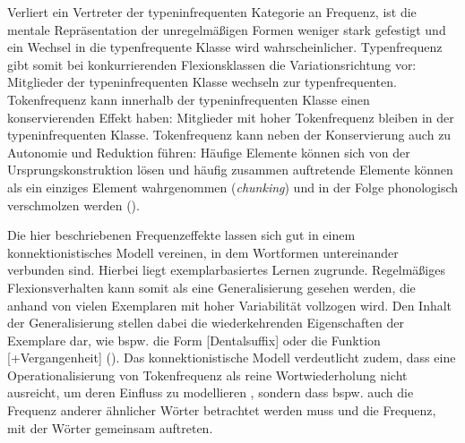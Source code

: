 Verliert ein Vertreter der typeninfrequenten Kategorie an Frequenz, ist die mentale Repräsentation der unregelmäßigen Formen weniger stark gefestigt und ein Wechsel in die typenfrequente Klasse wird wahrscheinlicher. Typenfrequenz gibt somit bei konkurrierenden Flexionsklassen die Variationsrichtung vor: Mitglieder der typeninfrequenten Klasse wechseln zur typenfrequenten. Tokenfrequenz kann innerhalb der typeninfrequenten Klasse einen konservierenden Effekt haben: Mitglieder mit hoher Tokenfrequenz bleiben in der typeninfrequenten Klasse. Tokenfrequenz kann neben der Konservierung auch zu Autonomie und Reduktion führen: Häufige Elemente können sich von der Ursprungskonstruktion lösen und häufig zusammen auftretende Elemente können als ein einziges Element wahrgenommen (\textit{chunking}) und in der Folge phonologisch verschmolzen werden (\cite[378--384]{Bybee.1997}). 



Die hier beschriebenen Frequenzeffekte lassen sich gut in einem konnektionistisches Modell vereinen, in dem Wortformen untereinander verbunden sind. Hierbei liegt exemplarbasiertes Lernen zugrunde. Regelmäßiges Flexionsverhalten kann somit als eine Generalisierung gesehen werden, die anhand von vielen Exemplaren mit hoher Variabilität vollzogen wird. Den Inhalt der Generalisierung stellen dabei die wiederkehrenden Eigenschaften der Exemplare dar, wie bspw. die Form [Dentalsuffix] oder die Funktion [+Vergangenheit] (\cite[67--68]{Goldberg.2019}). Das konnektionistische Modell verdeutlicht zudem, dass eine Operationalisierung von Tokenfrequenz als reine Wortwiederholung nicht ausreicht, um deren Einfluss zu modellieren \parencites[150--152]{Ellis.2002b}[57--58]{Divjak.2015}, sondern dass bspw. auch die Frequenz anderer ähnlicher Wörter betrachtet werden muss und die Frequenz, mit der Wörter gemeinsam auftreten. 


